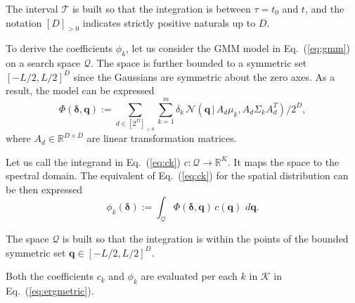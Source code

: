 \documentclass[letterpaper,10pt,conference,twoside]{IEEEtran}
\theoremstyle{definition}
\begin{document}
The interval $\mathcal{T}$ is built so that the integration is between $\tau=t_0$ and $t$, and the notation $[D]_{>0}$ indicates strictly positive naturals up to $D$.


To derive the coefficients $\phi_k$, let us consider the GMM model in Eq.~(\ref{eq:gmm}) on a search space $\mathcal{Q}$. The space is further bounded to a symmetric set $[-L/2,L/2]^D$ since the Gaussians are symmetric about the zero axes. %
As a result, the model can be expressed~\cite{calinon2020mixture}
\begin{equation}
  \Phi(\boldsymbol{\delta},\mathbf{q}):=\sum_{d\in[2^D]_{>0}}\sum_{k=1}^{m}\delta_k\,\mathcal{N}(\mathbf{q}\,|\,A_d\mu_k,A_d\Sigma_k A_d^T)/2^D,
\end{equation}
where $A_d\in\mathbb{R}^{D\times D}$ are linear transformation matrices. 

Let us call the integrand in Eq.~(\ref{eq:ck}) $c:\mathcal{Q}\longrightarrow \mathbb{R}^K$. It maps the space to the spectral domain. The equivalent of Eq.~(\ref{eq:ck}) for the spatial distribution can be then expressed
\begin{equation}\label{eq:phik}
  \phi_k(\boldsymbol{\delta}):=\int_{\mathcal{Q}} \Phi(\boldsymbol{\delta},\mathbf{q})\,c(\mathbf{q})\,\,d\mathbf{q}.
\end{equation}

The space $\mathcal{Q}$ is built so that the integration is within the points of the bounded symmetric set $\mathbf{q}\in[-L/2,L/2]^D$.

Both the coefficients $c_k$ and $\phi_k$ are evaluated per each $k$ in $\mathcal{K}$ in Eq.~(\ref{eq:ergmetric}).
\end{document}
